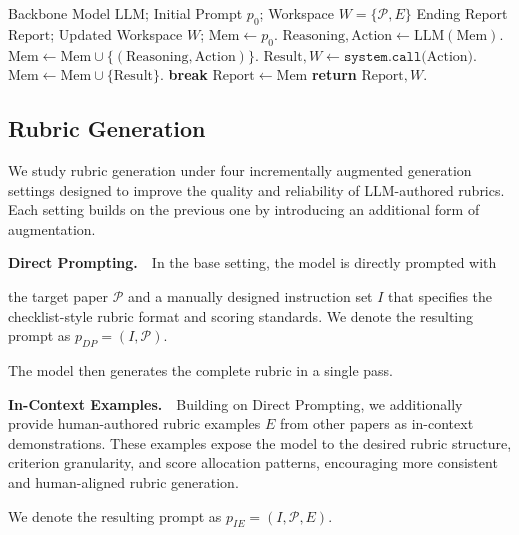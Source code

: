 \documentclass[11pt]{article}
\newif\ifreview
\newcommand{\hh}[1]{%
\ifreview
{\textcolor{orange!90!black}{#1}}
\else
#1
\fi
}
\begin{document}
\begin{algorithm}[t]
\small
\caption{Algorithm for the Agentic Scaffold}
\label{alg:agent}
\begin{algorithmic}[1]
\Require Backbone Model $\mathrm{LLM}$; Initial Prompt $p_0$; Workspace $W=\{\mathcal{P},E\}$
\Ensure Ending Report $\mathrm{Report}$; Updated Workspace $W$;
    \State $\mathrm{Mem}\gets p_0$.
        \State $\mathrm{Reasoning,Action}\gets \mathrm{LLM}(\mathrm{Mem})$.
            \State $\mathrm{Mem}\gets\mathrm{Mem}\cup\{(\mathrm{Reasoning,Action})\}$.
            \State $\mathrm{Result},W\gets\texttt{system.call(}\mathrm{Action}\texttt{)}$.
            \State $\mathrm{Mem}\gets\mathrm{Mem}\cup\{ \mathrm{Result}\}$.
            \State \textbf{break}
        \EndIf
    \EndWhile
    \State $\mathrm{Report}\gets\mathrm{Mem}$
    \State \textbf{return} $\mathrm{Report},W$.
\end{algorithmic}
\end{algorithm}
\subsection{Rubric Generation}

We study rubric generation under four incrementally augmented generation settings designed to improve the quality and reliability of LLM-authored rubrics. Each setting builds on the previous one by introducing an additional form of augmentation.

\noindent\textbf{Direct Prompting.}~~In the base setting, the model is directly prompted with \hh{the target paper $\mathcal{P}$ and a manually designed instruction set $I$ that specifies the checklist-style rubric format and scoring standards. We denote the resulting prompt as $p_{DP}=(I,\mathcal{P})$.} The model then generates the complete rubric in a single pass.

\noindent\textbf{In-Context Examples.}~~Building on Direct Prompting, we additionally provide human-authored rubric examples $E$ from other papers as in-context demonstrations. These examples expose the model to the desired rubric structure, criterion granularity, and score allocation patterns, encouraging more consistent and human-aligned rubric generation. \hh{We denote the resulting prompt as $p_{IE}=(I,\mathcal{P},E)$.}
\end{document}
